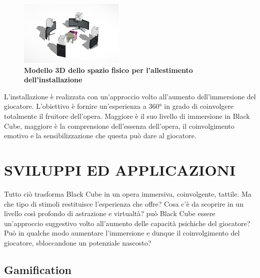 	\begin{figure}[h]
		\begin{center}
			\includegraphics[width=5cm]{img/image1.png}
			\caption{\textbf{Modello 3D dello spazio fisico per l'allestimento dell'installazione}}
				\label{gr01}
		\end{center}
	\end{figure}

L'installazione è realizzata con un'approccio volto all'aumento dell'immersione del giocatore. L'obiettivo è fornire un'esperienza a 360° in grado di coinvolgere totalmente il fruitore dell'opera. Maggiore è il suo livello di immersione in Black Cube, maggiore è la comprensione dell'essenza dell'opera, il coinvolgimento emotivo e la sensibilizzazione che questa può dare al giocatore.
	
\section*{SVILUPPI ED APPLICAZIONI}
Tutto ciò trasforma Black Cube in un opera immersiva, coinvolgente, tattile. Ma che tipo di stimoli restituisce l'esperienza che offre? Cosa c'è da scoprire in un livello così profondo di astrazione e virtualtà? può Black Cube essere un'approccio suggestivo volto all'aumento delle capacità psichiche del giocatore? Può in qualche modo aumentare l'immersione e dunque il coinvolgimento del giocatore, sbloccandone un potenziale nascosto?

	\subsection*{Gamification}

	
	
	
	
		
